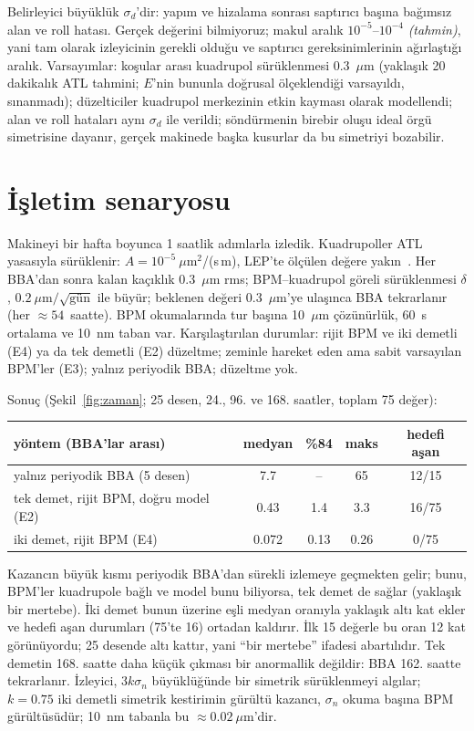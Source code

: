\documentclass[11pt,a4paper]{article}
\newcommand{\tahmin}{\textit{(tahmin)}}
\begin{document}
Belirleyici büyüklük $\sigma_d$'dir: yapım ve hizalama sonrası saptırıcı başına bağımsız alan ve roll hatası.
Gerçek değerini bilmiyoruz; makul aralık $10^{-5}$--$10^{-4}$ \tahmin, yani tam olarak izleyicinin gerekli olduğu
ve saptırıcı gereksinimlerinin ağırlaştığı aralık. Varsayımlar: koşular arası kuadrupol sürüklenmesi 0.3~$\mu$m
(yaklaşık 20 dakikalık ATL tahmini; $E$'nin bununla doğrusal ölçeklendiği varsayıldı, sınanmadı);
düzelticiler kuadrupol merkezinin etkin kayması olarak modellendi; alan ve roll hataları aynı $\sigma_d$ ile
verildi; söndürmenin birebir oluşu ideal örgü simetrisine dayanır, gerçek makinede başka kusurlar da bu
simetriyi bozabilir.

\section{İşletim senaryosu}\label{sec:zaman}
Makineyi bir hafta boyunca 1 saatlik adımlarla izledik. Kuadrupoller ATL yasasıyla sürüklenir:
$A=10^{-5}~\mu$m$^2$/(s\,m), LEP'te ölçülen değere yakın~\cite{shiltsev}. Her BBA'dan sonra kalan kaçıklık
0.3~$\mu$m rms; BPM--kuadrupol göreli sürüklenmesi $\delta$, $0.2~\mu$m$/\sqrt{\text{gün}}$ ile büyür; beklenen
değeri 0.3~$\mu$m'ye ulaşınca BBA tekrarlanır (her $\approx54$~saatte). BPM okumalarında tur başına 10~$\mu$m
çözünürlük, 60~s ortalama ve 10~nm taban var. Karşılaştırılan durumlar: rijit BPM ve iki demetli (E4) ya da tek
demetli (E2) düzeltme; zeminle hareket eden ama sabit varsayılan BPM'ler (E3); yalnız periyodik BBA; düzeltme yok.

Sonuç (Şekil~\ref{fig:zaman}; 25 desen, 24., 96. ve 168. saatler, toplam 75 değer):
\begin{center}\footnotesize
\begin{tabular}{lcccc}\toprule
yöntem (BBA'lar arası) & medyan & \%84 & maks & hedefi aşan\\\midrule
yalnız periyodik BBA (5 desen) & 7.7 & -- & 65 & 12/15\\
tek demet, rijit BPM, doğru model (E2) & 0.43 & 1.4 & 3.3 & 16/75\\
iki demet, rijit BPM (E4) & 0.072 & 0.13 & 0.26 & 0/75\\\bottomrule
\end{tabular}\end{center}
Kazancın büyük kısmı periyodik BBA'dan sürekli izlemeye geçmekten gelir; bunu, BPM'ler kuadrupole bağlı ve
model bunu biliyorsa, tek demet de sağlar (yaklaşık bir mertebe). İki demet bunun üzerine eşli medyan oranıyla
yaklaşık altı kat ekler ve hedefi aşan durumları (75'te 16) ortadan kaldırır. İlk 15 değerle bu oran 12 kat
görünüyordu; 25 desende altı kattır, yani ``bir mertebe'' ifadesi abartılıdır. Tek demetin 168. saatte daha
küçük çıkması bir anormallik değildir: BBA 162. saatte tekrarlanır. İzleyici, $3k\sigma_n$ büyüklüğünde bir
simetrik sürüklenmeyi algılar; $k=0.75$ iki demetli simetrik kestirimin gürültü kazancı, $\sigma_n$ okuma başına
BPM gürültüsüdür; 10~nm tabanla bu $\approx0.02~\mu$m'dir.
\end{document}
